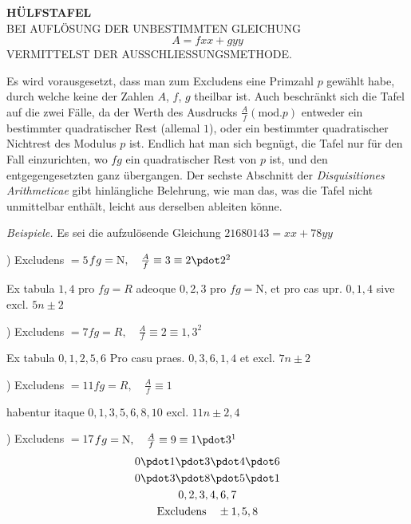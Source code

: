 \clearpage{}
\renewcommand{\BookRunningTitle}{Hülfstafel bei Auflösung der unbestimmten Gleichung}
\begin{center}
\textbf{HÜLFSTAFEL}\\[.7em]
BEI AUFLÖSUNG DER UNBESTIMMTEN GLEICHUNG
\[
A=fxx+gyy
\]
VERMITTELST DER AUSSCHLIESSUNGSMETHODE.
\end{center}
Es wird vorausgesetzt, dass man zum Excludens eine Primzahl $p$ gewählt habe, durch welche keine der Zahlen $A$, $f$, $g$ theilbar ist. Auch beschränkt sich die Tafel auf die zwei Fälle, da der Werth des Ausdrucks $\frac{A}{f}(\mathrm{mod}.p)$ entweder ein bestimmter quadratischer Rest (allemal $1$), oder ein bestimmter quadratischer Nichtrest des Modulus $p$ ist. Endlich hat man sich begnügt, die Tafel nur für den Fall einzurichten, wo $fg$ ein quadratischer Rest von $p$ ist, und den entgegengesetzten ganz übergangen. Der sechste Abschnitt der \textit{Disquisitiones Arithmeticae} gibt hinlängliche Belehrung, wie man das, was die Tafel nicht unmittelbar enthält, leicht aus derselben ableiten könne.
\par\medskip\textit{Beispiele.} Es sei die aufzulösende Gleichung $21680143=xx+78yy$
\par\medskip{}) Excludens $=5$\hfill $fg=\mathrm{N},\quad \frac{A}{f}\equiv3\equiv2\pdot2^2$
\par\noindent Ex tabula $1,4$ pro $fg=R$ adeoque $0,2,3$ pro $fg=\mathrm{N}$,
et pro cas upr. $0,1,4$ sive excl. $5n\pm2$
\par\medskip{}) Excludens $=7$\hfill $fg=R,\quad \frac{A}{f}\equiv2\equiv1,3^2$
\par\noindent Ex tabula $0,1,2,5,6$ Pro casu praes. $0,3,6,1,4$ et excl. $7n\pm2$
\par\medskip{}) Excludens $=11$\hfill $fg=R,\quad \frac{A}{f}\equiv1$
\par\noindent habentur itaque $0,1,3,5,6,8,10$ excl. $11n\pm2,4$
\par\medskip{}) Excludens $=17$\hfill $fg=\mathrm{N},\quad \frac{A}{f}\equiv9\equiv1\pdot3^1$
\[
\begin{gathered}
0\pdot1\pdot3\pdot4\pdot6\\
0\pdot3\pdot8\pdot5\pdot1\\
0,2,3,4,6,7\\
\text{Excludens}\quad\pm1,5,8
\end{gathered}
\]
